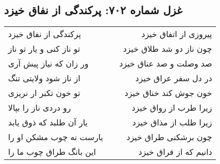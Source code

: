 \begin{center}
\section*{غزل شماره ۷۰۲: پرکندگی از نفاق خیزد}
\label{sec:0702}
\begin{longtable}{l p{0.5cm} r}
پرکندگی از نفاق خیزد
&&
پیروزی از اتفاق خیزد
\\
تو ناز کنی و یار تو ناز
&&
چون ناز دو شد طلاق خیزد
\\
ور زان که نیاز پیش آری
&&
صد وصلت و صد عناق خیزد
\\
از ناز شود ولایتی تنگ
&&
در دل سفر عراق خیزد
\\
تو خون تکبر ار نریزی
&&
خون جوش کند خناق خیزد
\\
رو دردی ناز را بپالا
&&
زیرا طرب از رواق خیزد
\\
یار آن طلبد که ذوق یابد
&&
زیرا طلب از مذاق خیزد
\\
یارست نه چوب مشکن او را
&&
چون برشکنی طراق خیزد
\\
این بانگ طراق چوب ما را
&&
دانیم که از فراق خیزد
\\
\end{longtable}
\end{center}
